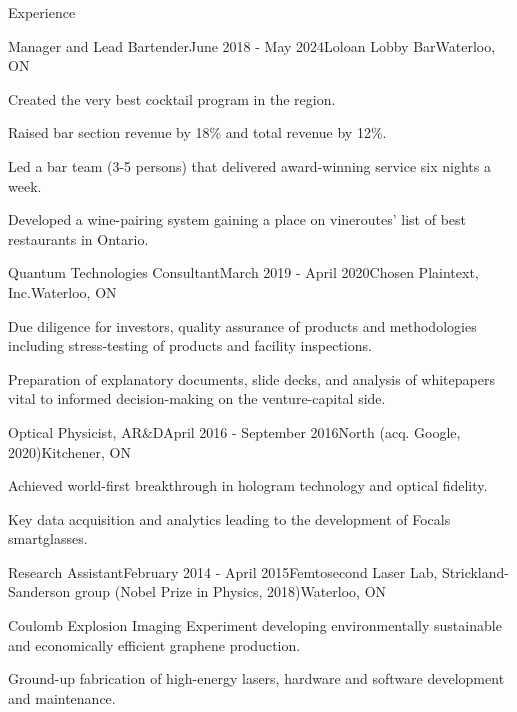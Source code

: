 \documentclass{resume}
\begin{document}

\begin{rSection}{Experience}
    \begin{rSubsection}{Manager and Lead Bartender}{June 2018 - May 2024}{Loloan Lobby Bar}{Waterloo, ON}
        \item Created the very best cocktail program in the region.
        \item Raised bar section revenue by 18\% and total revenue by 12\%.
        \item Led a bar team (3-5 persons) that delivered award-winning service six nights a week.
        \item Developed a wine-pairing system gaining a place on vineroutes' list of best restaurants in Ontario.
    \end{rSubsection}

    \begin{rSubsection}{Quantum Technologies Consultant}{March 2019 - April 2020}{Chosen Plaintext, Inc.}{Waterloo, ON}
    \item Due diligence for investors, quality assurance of products and methodologies including stress-testing of products and facility inspections.
    \item Preparation of explanatory documents, slide decks, and analysis of whitepapers vital to informed decision-making on the venture-capital side.
    \end{rSubsection}

    \begin{rSubsection}{Optical Physicist, AR\&D}{April 2016 - September 2016}{North (acq. Google, 2020)}{Kitchener, ON}
        \item Achieved world-first breakthrough in hologram technology and optical fidelity.
        \item Key data acquisition and analytics leading to the development of Focals smartglasses.
    \end{rSubsection}

    \begin{rSubsection}{Research Assistant}{February 2014 - April 2015}{Femtosecond Laser Lab, Strickland-Sanderson group (Nobel Prize in Physics, 2018)}{Waterloo, ON}
        \item Coulomb Explosion Imaging Experiment developing environmentally sustainable and economically efficient graphene production.
        \item Ground-up fabrication of high-energy lasers, hardware and software development and maintenance. 
    \end{rSubsection}

\end{rSection}
\end{document}
